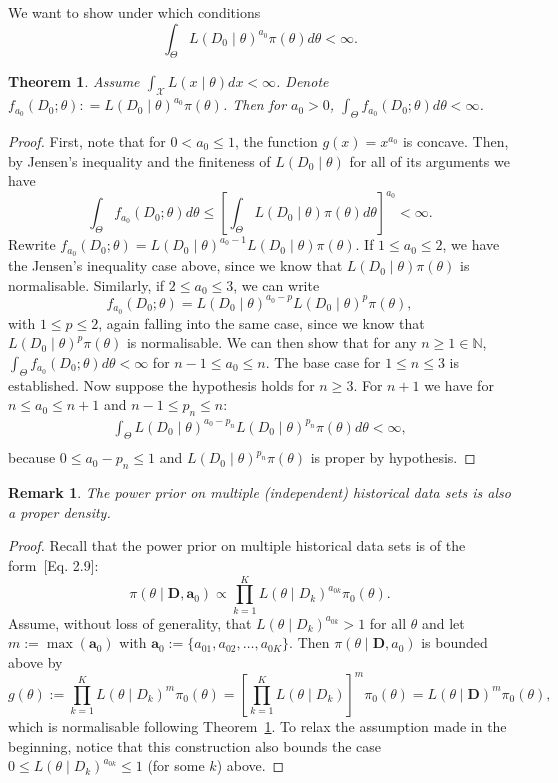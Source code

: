 \documentclass[a4paper, notitlepage, 11pt]{article}
\newtheorem{theorem}{Theorem}[]
\newtheorem{remark}{Remark}[]
\begin{document}
We want to show under which conditions
\[\int_{\Theta} L( D_0 \mid \theta)^{a_0}\pi(\theta) d\theta <\infty.\]
\begin{theorem}
\label{thm:integrability}
 Assume $\int_{\mathcal{X}} L( x \mid \theta)dx < \infty$.
 Denote $f_{a_0}(D_0;\theta) : = L( D_0 \mid \theta)^{a_0}\pi(\theta)$.
 Then for $a_0 > 0$, $\int_{\Theta} f_{a_0}(D_0;\theta) d\theta <\infty$.
\end{theorem}
\begin{proof}
First, note that for $0 < a_0 \leq 1$, the function $g(x) = x^{a_0}$ is concave.
Then, by Jensen's inequality and the finiteness of $L( D_0 \mid \theta)$ for all of its arguments we have
\[ \int_{\Theta} f_{a_0}(D_0; \theta) d\theta \leq \left[ \int_{\Theta} L(D_0 \mid\theta)\pi(\theta)d\theta \right]^{a_0} < \infty. \]
Rewrite $f_{a_0}(D_0; \theta) = L(D_0\mid\theta)^{a_0 -1} L(D_0\mid\theta)\pi(\theta)$.
If $1 \leq a_0 \leq 2$, we have the Jensen's inequality case above, since we know that $L(D_0\mid\theta)\pi(\theta)$ is normalisable.
Similarly, if $2 \leq a_0 \leq 3$, we can write 
\[  f_{a_0}(D_0; \theta) = L(D_0\mid\theta)^{a_0-p} L(D_0\mid\theta)^p\pi(\theta), \]
with $1 \leq p \leq 2$, again falling into the same case, since we know that $L(D_0\mid\theta)^{p}\pi(\theta)$ is normalisable.
We can then show that for any $n \geq 1 \in \mathbb{N}$, $\int_{\Theta}f_{a_0}( D_0 ; \theta)d\theta < \infty$ for  $n-1 \leq a_0 \leq n$.
The base case for $1 \leq n \leq 3$ is established.
Now suppose the hypothesis holds for $n \geq 3$.
For $n + 1$ we have for $ n \leq  a_0 \leq n + 1$ and $n-1 \leq p_n \leq n$:
\begin{align*}
 \int_{\Theta} L(D_0\mid\theta)^{a_0-p_n} L(D_0\mid\theta)^{p_n}\pi(\theta)d\theta < \infty, \\
\end{align*}
because $0 \leq a_0 - p_n \leq 1$ and $L(D_0\mid\theta)^{p_n}\pi(\theta)$ is proper by hypothesis.
\end{proof}
\begin{remark}
 The power prior on multiple (independent) historical data sets is also a proper density.
\end{remark}
\begin{proof}
 Recall that the power prior on multiple historical data sets is of the form~[Eq. 2.9]\citep{Ibrahim2015}:
 \[ \pi(\theta \mid \boldsymbol D, \boldsymbol a_0) \propto \prod_{k=1}^K L(\theta \mid D_k)^{a_{0k}} \pi_0(\theta). \]
Assume, without loss of generality, that $L(\theta \mid  D_k)^{a_{0k}} > 1$ for all $\theta$ and let $m := \max(\boldsymbol a_0)$ with $\boldsymbol a_0 := \{ a_{01}, a_{02}, \ldots, a_{0K}\}$.
Then $\pi(\theta \mid \boldsymbol D, a_0)$ is bounded above by 
\[  g(\theta) :=  \prod_{k=1}^K L(\theta \mid D_k)^{m} \pi_0(\theta) =  \left[ \prod_{k=1}^K L(\theta \mid D_k) \right]^m  \pi_0(\theta) = L(\theta \mid \boldsymbol D)^m \pi_0(\theta), \]
which is normalisable following Theorem~\ref{thm:integrability}.
To relax the assumption made in the beginning, notice that this construction also bounds the case $ 0 \leq  L(\theta \mid  D_k)^{a_{0k}} \leq 1$ (for some $k$) above.
\end{proof}
\end{document}
